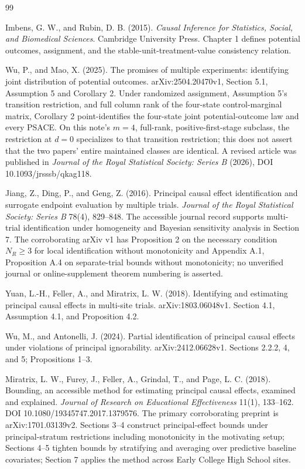\documentclass{article}
\begin{document}
\begin{thebibliography}{99}

   Imbens, G. W., and Rubin, D. B. (2015). \emph{Causal Inference for Statistics, Social, and Biomedical Sciences}. Cambridge University Press. Chapter 1 defines potential outcomes, assignment, and the stable-unit-treatment-value consistency relation.

   Wu, P., and Mao, X. (2025). The promises of multiple experiments: identifying joint distribution of potential outcomes. arXiv:2504.20470v1, Section 5.1, Assumption 5 and Corollary 2. Under randomized assignment, Assumption 5's transition restriction, and full column rank of the four-state control-marginal matrix, Corollary 2 point-identifies the four-state joint potential-outcome law and every PSACE. On this note's \(m=4\), full-rank, positive-first-stage subclass, the restriction at \(d=0\) specializes to that transition restriction; this does not assert that the two papers' entire maintained classes are identical. A revised article was published in \emph{Journal of the Royal Statistical Society: Series B} (2026), DOI 10.1093/jrsssb/qkag118.

   Jiang, Z., Ding, P., and Geng, Z. (2016). Principal causal effect identification and surrogate endpoint evaluation by multiple trials. \emph{Journal of the Royal Statistical Society: Series B} 78(4), 829--848. The accessible journal record supports multi-trial identification under homogeneity and Bayesian sensitivity analysis in Section 7. The corroborating arXiv v1 has Proposition 2 on the necessary condition \(N_R\ge3\) for local identification without monotonicity and Appendix A.1, Proposition A.4 on separate-trial bounds without monotonicity; no unverified journal or online-supplement theorem numbering is asserted.

   Yuan, L.-H., Feller, A., and Miratrix, L. W. (2018). Identifying and estimating principal causal effects in multi-site trials. arXiv:1803.06048v1. Section 4.1, Assumption 4.1, and Proposition 4.2.

   Wu, M., and Antonelli, J. (2024). Partial identification of principal causal effects under violations of principal ignorability. arXiv:2412.06628v1. Sections 2.2.2, 4, and 5; Propositions 1--3.

   Miratrix, L. W., Furey, J., Feller, A., Grindal, T., and Page, L. C. (2018). Bounding, an accessible method for estimating principal causal effects, examined and explained. \emph{Journal of Research on Educational Effectiveness} 11(1), 133--162. DOI 10.1080/19345747.2017.1379576. The primary corroborating preprint is arXiv:1701.03139v2. Sections 3--4 construct principal-effect bounds under principal-stratum restrictions including monotonicity in the motivating setup; Sections 4--5 tighten bounds by stratifying and averaging over predictive baseline covariates; Section 7 applies the method across Early College High School sites.


\end{thebibliography}
\end{document}
